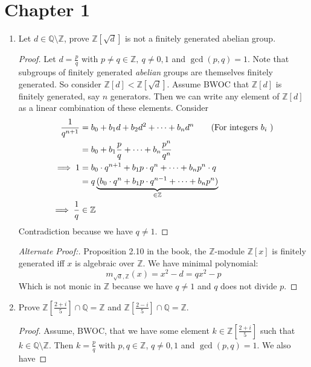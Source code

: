 \documentclass[hidelinks,12pt]{article}
\title{\scalebox{1.45}{Arithmetic Geometry Problems}}
\author{\scalebox{1.5}{Theo Koss}}
\date{October 2024}
\newcommand{\Z}{\mathbb{Z}}
\newcommand{\Q}{\mathbb{Q}}
\begin{document}
\maketitle
\section{Chapter 1}
\begin{enumerate}
    \item Let \(d\in\Q\setminus\Z\), prove \(\Z[\sqrt{d}]\) is not a finitely generated abelian group.
        \begin{proof}
            Let \(d=\frac{p}{q}\) with \(p\neq q\in\Z,\ q\neq0,1\)  and \(\gcd(p,q)=1\). Note that subgroups of finitely generated \emph{abelian} groups are themselves finitely generated. So consider \(\Z[d]<\Z[\sqrt{d}]\). Assume BWOC that \(\Z[d]\) is finitely generated, say \(n\) generators. Then we can write any element of \(\Z[d]\) as a linear combination of these elements. Consider 
            \begin{align*}
                \frac{1}{q^{n+1}}&=b_{0}+b_{1}d+b_{2}d^{2}+\dots+b_{n}d^{n}\tag{For integers \(b_{i}\) }\\
                                 &=b_{0}+b_{1}\frac{p}{q}+\dots+b_{n}\frac{p^{n}}{q^{n}}\\
                \implies 1&=b_{0}\cdot q^{n+1}+b_{1}p\cdot q^{n}+\dots+b_{n}p^{n}\cdot q\\
                          &=q\underbrace{(b_{0}\cdot q^{n}+b_{1}p\cdot q^{n-1}+\dots+b_{n}p^{n})}_{\in\Z}\\
                \implies \frac{1}{q}&\in\Z\\
            \end{align*}
            Contradiction because we have \(q\neq1\).
        \end{proof}
        \begin{proof}[Alternate Proof:]
            Proposition 2.10 in the book, the \(\Z\)-module \(\Z[x]\) is finitely generated iff \(x\) is algebraic over \(\Z\). We have minimal polynomial: \[
                m_{\sqrt{d},\Z}(x)=x^{2}-d=qx^{2}-p
            \]
            Which is not monic in \(\Z\) because we have \(q\neq1\) and \(q\) does not divide \(p\).
        \end{proof}
    \item Prove \(\Z[\frac{2+i}{5}]\cap\Q=\Z\) and \(\Z[\frac{2-i}{5}]\cap\Q=\Z\).
        \begin{proof}
            Assume, BWOC, that we have some element \(k\in\Z[\frac{2+i}{5}]\) such that \(k\in\Q\setminus\Z\). Then \(k=\frac{p}{q}\) with \(p,q\in\Z\), \(q\neq0,1\) and \(\gcd(p,q)=1\). We also have

\end{proof}
\end{enumerate}
\end{document}
